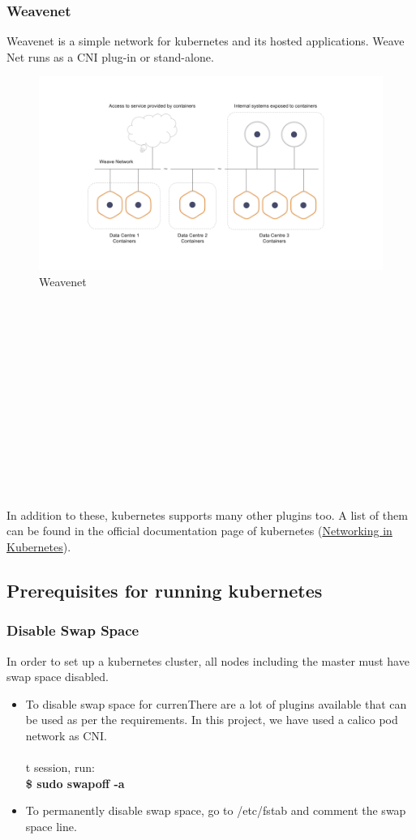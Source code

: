 \documentclass[12pt]{report}
\begin{document}
\subsubsection{Weavenet}
Weavenet is a simple network for kubernetes and its hosted applications. Weave Net runs as a CNI plug-in or stand-alone.
\begin{figure}[h!]
	\begin{center}
		\includegraphics[totalheight=0.33\textheight]{weavenet}
		\caption{Weavenet \cite{Weavenet}}
	\end{center}
\end{figure}
\\\\\\\\\\\\\\\\\\\\\\\\
\\In addition to these, kubernetes supports many other plugins too. A list of them can be found in the official documentation page of kubernetes (\href{https://kubernetes.io/docs/concepts/cluster-administration/networking/}{Networking in Kubernetes}).
\subsection{Prerequisites for running kubernetes \cite{Prereq}}
\subsubsection{Disable Swap Space}
In order to set up a kubernetes cluster, all nodes including the master must have swap space disabled.
\begin{itemize}
	\item To disable swap space for currenThere are a lot of plugins available that can be used as per the requirements. In this project, we have used a calico pod network as CNI.\\\\t session, run: \\
	\textbf{\$ sudo swapoff -a}
	\item To permanently disable swap space, go to /etc/fstab and comment the swap space line.
\end{itemize}
\end{document}
